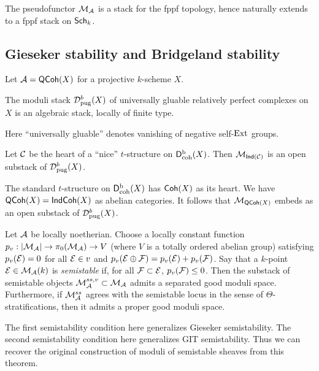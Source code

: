 \documentclass{amsart}
\begin{document}
\begin{thm}
	The pseudofunctor $\mathcal{M}_{\mathcal{A}}$ is a stack for the fppf topology, hence naturally extends to a fppf stack on $\mathsf{Sch}_k$.
\end{thm}

\subsection{Gieseker stability and Bridgeland stability}

Let $\mathcal{A} = \mathsf{QCoh}(X)$ for a projective $k$-scheme $X$.

\begin{thm}[Lieblich]
	The moduli stack $\mathcal{D}^b_{\mathrm{pug}}(X)$ of universally gluable relatively perfect complexes on $X$ is an algebraic stack, locally of finite type.
\end{thm}

Here ``universally gluable'' denotes vanishing of negative self-$\operatorname{Ext}$ groups.

\begin{thm}
	Let $\mathcal{C}$ be the heart of a ``nice'' $t$-structure on $\mathsf{D}^{\mathrm{b}}_{\mathrm{coh}}(X)$.
	Then $\mathcal{M}_{\mathsf{Ind}(\mathcal{C})}$ is an open substack of $\mathcal{D}^b_{\mathrm{pug}}(X)$.
\end{thm}

\begin{ex}
	The standard $t$-structure on $\mathsf{D}^{\mathrm{b}}_{\mathrm{coh}}(X)$ has $\mathsf{Coh}(X)$ as its heart.
	We have $\mathsf{QCoh}(X) = \mathsf{Ind} \mathsf{Coh}(X)$ as abelian categories.
	It follows that $\mathcal{M}_{\mathsf{QCoh}(X)}$ embeds as an open substack of $\mathcal{D}^b_{\mathrm{pug}}(X)$.
\end{ex}

\begin{thm}
	Let $\mathcal{A}$ be locally noetherian.
	Choose a locally constant function $p_v: \left|{\mathcal{M}_{\mathcal{A}}}\right| \to \pi_0(\mathcal{M}_{\mathcal{A}}) \to V$ (where $V$ is a totally ordered abelian group) satisfying $p_v(\mathcal{E}) = 0$ for all $\mathcal{E} \in v$ and $p_v(\mathcal{E} \oplus \mathcal{F}) = p_v(\mathcal{E}) + p_v(\mathcal{F})$.
	Say that a $k$-point $\mathcal{E} \in \mathcal{M}_{\mathcal{A}}(k)$ is \emph{semistable} if, for all $\mathcal{F} \subset \mathcal{E}$, $p_v(\mathcal{F}) \leq 0$.
	Then the substack of semistable objects $\mathcal{M}_{\mathcal{A}}^{ss,v} \subset \mathcal{M}_{\mathcal{A}}$ admits a separated good moduli space.
	Furthermore, if $\mathcal{M}_{\mathcal{A}}^{ss}$ agrees with the semistable locus in the sense of $\Theta$-stratifications, then it admits a proper good moduli space.
\end{thm}

The first semistability condition here generalizes Gieseker semistability.
The second semistability condition here generalizes GIT semistability.
Thus we can recover the original construction of moduli of semistable sheaves from this theorem.
\end{document}
